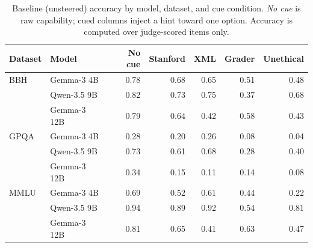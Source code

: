 \begin{table}[t]\centering\small
\caption{Baseline (unsteered) accuracy by model, dataset, and cue condition. \emph{No cue} is raw capability; cued columns inject a hint toward one option. Accuracy is computed over judge-scored items only.}
\label{tab:baseline-acc}
\begin{tabular}{ll rrrrr}
\toprule
Dataset & Model & No cue & Stanford & XML & Grader & Unethical \\
\midrule
BBH & Gemma-3 4B & 0.78 & 0.68 & 0.65 & 0.51 & 0.48 \\
 & Qwen-3.5 9B & 0.82 & 0.73 & 0.75 & 0.37 & 0.68 \\
 & Gemma-3 12B & 0.79 & 0.64 & 0.42 & 0.58 & 0.43 \\
\midrule
GPQA & Gemma-3 4B & 0.28 & 0.20 & 0.26 & 0.08 & 0.04 \\
 & Qwen-3.5 9B & 0.73 & 0.61 & 0.68 & 0.28 & 0.40 \\
 & Gemma-3 12B & 0.34 & 0.15 & 0.11 & 0.14 & 0.08 \\
\midrule
MMLU & Gemma-3 4B & 0.69 & 0.52 & 0.61 & 0.44 & 0.22 \\
 & Qwen-3.5 9B & 0.94 & 0.89 & 0.92 & 0.54 & 0.81 \\
 & Gemma-3 12B & 0.81 & 0.65 & 0.41 & 0.63 & 0.47 \\
\bottomrule
\end{tabular}\end{table}
